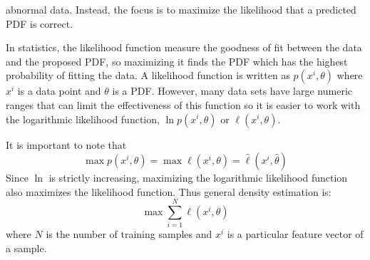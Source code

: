 \documentclass[10pt,a4paper]{report}
\begin{document}
					abnormal data. Instead, the focus is to maximize the likelihood that a predicted PDF is correct. \par
					In statistics, the likelihood function measure the goodness of fit between the data and the proposed PDF, so maximizing it finds the PDF which
					has the highest probability of fitting the data.
					A likelihood function is written as $p(x^i,\theta)$ where $x^i$ is a data point and $\theta$ is a PDF.
					However, many data sets have large  numeric ranges that can limit the effectiveness of this function so it is easier to work with the
					logarithmic likelihood function, $\ln p(x^i,\theta)$ or $\ell(x^i,\theta)$. \par
					It is important to note that
					\begin{equation}
						\max p(x^i,\theta) = \max \ell(x^i,\theta) = \widehat{\ell}(x^i, \widehat{\theta})
					\end{equation}
					Since $\ln$ is strictly increasing, maximizing the logarithmic likelihood function also maximizes the likelihood function. Thus general density estimation \autocite[p. 4]{SurveyOfOptimizationMethods} is:
					\begin{equation}
						\max \sum_{i=1}^N \ell(x^i,\theta)
					\end{equation}
					where $N$ is the number of training samples and $x^i$ is a particular feature vector of a sample.
\end{document}
